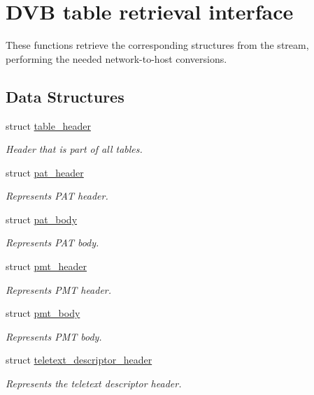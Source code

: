 \hypertarget{group__structure}{}\section{D\+VB table retrieval interface}
\label{group__structure}


These functions retrieve the corresponding structures from the stream, performing the needed network-\/to-\/host conversions.  


\subsection*{Data Structures}
\begin{DoxyCompactItemize}
\item 
struct \hyperlink{structtable__header}{table\+\_\+header}
\begin{DoxyCompactList}\small\item\em Header that is part of all tables. \end{DoxyCompactList}\item 
struct \hyperlink{structpat__header}{pat\+\_\+header}
\begin{DoxyCompactList}\small\item\em Represents P\+AT header. \end{DoxyCompactList}\item 
struct \hyperlink{structpat__body}{pat\+\_\+body}
\begin{DoxyCompactList}\small\item\em Represents P\+AT body. \end{DoxyCompactList}\item 
struct \hyperlink{structpmt__header}{pmt\+\_\+header}
\begin{DoxyCompactList}\small\item\em Represents P\+MT header. \end{DoxyCompactList}\item 
struct \hyperlink{structpmt__body}{pmt\+\_\+body}
\begin{DoxyCompactList}\small\item\em Represents P\+MT body. \end{DoxyCompactList}\item 
struct \hyperlink{structteletext__descriptor__header}{teletext\+\_\+descriptor\+\_\+header}
\begin{DoxyCompactList}\small\item\em Represents the teletext descriptor header. \end{DoxyCompactList}\item 

\end{DoxyCompactItemize}

